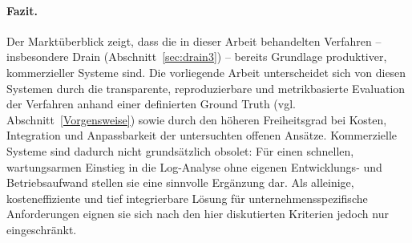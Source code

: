 \paragraph{Fazit.}
Der Marktüberblick zeigt, dass die in dieser Arbeit behandelten Verfahren -- insbesondere Drain (Abschnitt~\ref{sec:drain3}) -- bereits Grundlage produktiver, kommerzieller Systeme sind. Die vorliegende Arbeit unterscheidet sich von diesen Systemen durch die transparente, reproduzierbare und metrikbasierte Evaluation der Verfahren anhand einer definierten Ground Truth (vgl. Abschnitt~\ref{Vorgensweise}) sowie durch den höheren Freiheitsgrad bei Kosten, Integration und Anpassbarkeit der untersuchten offenen Ansätze. Kommerzielle Systeme sind dadurch nicht grundsätzlich obsolet: Für einen schnellen, wartungsarmen Einstieg in die Log-Analyse ohne eigenen Entwicklungs- und Betriebsaufwand stellen sie eine sinnvolle Ergänzung dar. Als alleinige, kosteneffiziente und tief integrierbare Lösung für unternehmensspezifische Anforderungen eignen sie sich nach den hier diskutierten Kriterien jedoch nur eingeschränkt.

